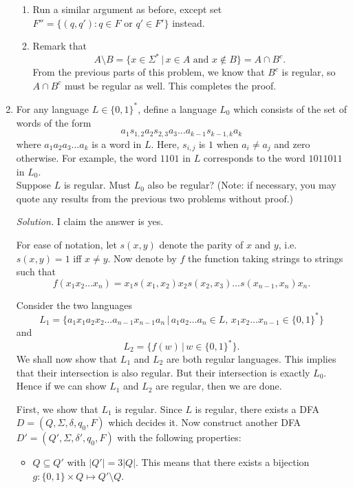 \documentclass[11pt]{article}
\newcounter{enum}
\newcommand{\solution}
{
\vspace{5pt}
\noindent\textit{Solution.}\qquad
}
\begin{document}
\begin{enumerate}
\begin{enumerate}
\item Run a similar argument as before, except set $F''=\{(q,q'):q\in F\text{ or }q'\in F'\}$ instead.

\item Remark that \[A\setminus B = \{x\in\Sigma^*\,|\,x\in A\text{ and }x\not\in B\} = A\cap B^c.\] From the previous parts of this problem, we know that $B^c$ is regular, so $A\cap B^c$ must be regular as well.  This completes the proof.

\end{enumerate}

\item For any language $L\in\{0,1\}^*$, define a language $L_0$ which consists of the set of words of the form \[a_1s_{1,2}a_2s_{2,3}a_3\ldots a_{k-1}s_{k-1,k}a_k\] where $a_1a_2a_3\ldots a_k$ is a word in $L$.  Here, $s_{i,j}$ is $1$ when $a_i\neq a_j$ and zero otherwise. For example, the word $1101$ in $L$ corresponds to the word $1011011$ in $L_0$.\\

Suppose $L$ is regular.  Must $L_0$ also be regular?  (Note: if necessary, you may quote any results from the previous two problems without proof.)

\solution I claim the answer is yes.

\par For ease of notation, let $s(x,y)$ denote the parity of $x$ and $y$, i.e. $s(x,y)=1$ iff $x\neq y$.  Now denote by $f$ the function taking strings to strings such that \[f(x_1x_2\ldots x_n)=x_1s(x_1,x_2)x_2s(x_2,x_3)\ldots s(x_{n-1},x_n)x_n.\]

\par Consider the two languages \[L_1 = \{a_1x_1a_2x_2\ldots a_{n-1}x_{n-1}a_n\,|\,a_1a_2\ldots a_n\in L,\,x_1x_2\ldots x_{n-1}\in\{0,1\}^*\}\] and \[L_2 = \{f(w)\,|\, w\in \{0,1\}^*\}.\] We shall now show that $L_1$ and $L_2$ are both regular languages.  This implies that their intersection is also regular.  But their intersection is exactly $L_0$.  Hence if we can show $L_1$ and $L_2$ are regular, then we are done.

\par First, we show that $L_1$ is regular.  Since $L$ is regular, there exists a DFA $D=(Q,\Sigma,\delta,q_0,F)$ which decides it.  Now construct another DFA $D'=(Q',\Sigma,\delta',q_0,F)$ with the following properties:

\begin{itemize}

\item $Q\subseteq Q'$ with $|Q'| = 3|Q|$.  This means that there exists a bijection $g:\{0,1\}\times Q\mapsto Q'\setminus Q$.


\end{itemize}
\end{enumerate}
\end{document}
